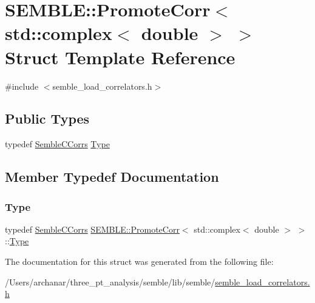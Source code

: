 \hypertarget{structSEMBLE_1_1PromoteCorr_3_01std_1_1complex_3_01double_01_4_01_4}{}\section{S\+E\+M\+B\+LE\+:\+:Promote\+Corr$<$ std\+:\+:complex$<$ double $>$ $>$ Struct Template Reference}
\label{structSEMBLE_1_1PromoteCorr_3_01std_1_1complex_3_01double_01_4_01_4}


{\ttfamily \#include $<$semble\+\_\+load\+\_\+correlators.\+h$>$}

\subsection*{Public Types}
\begin{DoxyCompactItemize}
\item 
typedef \mbox{\hyperlink{classSEMBLE_1_1SembleCCorrs}{Semble\+C\+Corrs}} \mbox{\hyperlink{structSEMBLE_1_1PromoteCorr_3_01std_1_1complex_3_01double_01_4_01_4_ab5cb4103b653eb69424e1ae1e3827b25}{Type}}
\end{DoxyCompactItemize}


\subsection{Member Typedef Documentation}
\mbox{\label{structSEMBLE_1_1PromoteCorr_3_01std_1_1complex_3_01double_01_4_01_4_ab5cb4103b653eb69424e1ae1e3827b25}} 
\subsubsection{\texorpdfstring{Type}{Type}}
{\footnotesize\ttfamily typedef \mbox{\hyperlink{classSEMBLE_1_1SembleCCorrs}{Semble\+C\+Corrs}} \mbox{\hyperlink{structSEMBLE_1_1PromoteCorr}{S\+E\+M\+B\+L\+E\+::\+Promote\+Corr}}$<$ std\+::complex$<$ double $>$ $>$\+::\mbox{\hyperlink{structSEMBLE_1_1PromoteCorr_3_01std_1_1complex_3_01double_01_4_01_4_ab5cb4103b653eb69424e1ae1e3827b25}{Type}}}



The documentation for this struct was generated from the following file\+:\begin{DoxyCompactItemize}
\item 
/\+Users/archanar/three\+\_\+pt\+\_\+analysis/semble/lib/semble/\mbox{\hyperlink{semble__load__correlators_8h}{semble\+\_\+load\+\_\+correlators.\+h}}\end{DoxyCompactItemize}
